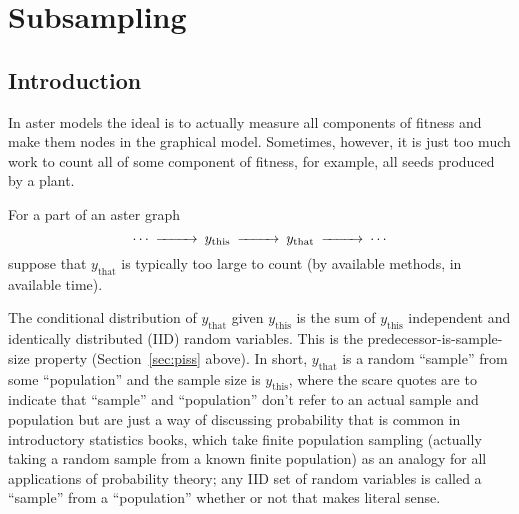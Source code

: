 
\chapter{Subsampling} \label{ch:subsampling}

\section{Introduction}

In aster models the ideal is to actually measure
all components of fitness and make them nodes in the graphical model.
Sometimes, however, it is just too much work to count all of some component
of fitness, for example, all seeds produced by a plant.

For a part of an aster graph
$$
\begin{CD}
   \cdots @>>> y_\text{this} @>>> y_\text{that} @>>> \cdots
\end{CD}
$$
suppose that $y_\text{that}$ is typically too large to count
(by available methods, in available time).

The conditional distribution of $y_\text{that}$ given $y_\text{this}$ is
the sum of $y_\text{this}$
independent and identically distributed (IID) random variables.
This is the predecessor-is-sample-size property
(Section~\ref{sec:piss} above).
In short, $y_\text{that}$ is a random ``sample''
from some ``population'' and the sample size is $y_\text{this}$, where the scare
quotes are to indicate that ``sample'' and ``population'' don't refer
to an actual sample and population but are just a way of discussing
probability that is common in introductory statistics books, which
take finite population sampling (actually taking a random sample from
a known finite population) as an analogy for all applications of probability
theory; any IID set of random variables is called a ``sample'' from
a ``population'' whether or not that makes literal sense.


